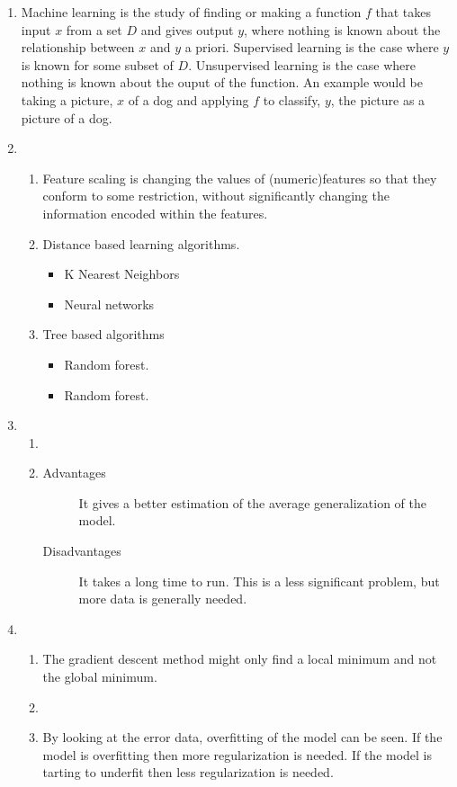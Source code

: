 \begin{enumerate}
  \item Machine learning is the study of finding or making a function $f$ that takes input $x$ from a set $D$ and gives output $y$, where nothing is known about the relationship between $x$ and $y$ a priori.
        Supervised learning is the case where $y$ is known for some subset of $D$.
        Unsupervised learning is the case where nothing is known about the ouput of the function.
        An example would be taking a picture, $x$ of a dog and applying $f$ to classify, $y$, the picture as a picture of a dog.
  \item
      \begin{enumerate}
        \item Feature scaling is changing the values of (numeric)features so that they conform to some restriction, without significantly changing the information encoded within the features.
        \item Distance based learning algorithms.
          \begin{itemize}
            \item K Nearest Neighbors
            \item Neural networks
          \end{itemize}
        \item Tree based algorithms
          \begin{itemize}
            \item Random forest.
            \item Random forest.
          \end{itemize}
      \end{enumerate}
    \item
      \begin{enumerate}
        \item
        \item
          \begin{description}
              \item[Advantages] It gives a better estimation of the average generalization of the model.
              \item[Disadvantages] It takes a long time to run.
                                   This is a less significant problem, but more data is generally needed.
          \end{description}
      \end{enumerate}
    \item
      \begin{enumerate}
          \item
            The gradient descent method might only find a local minimum and not the global minimum.
          \item

          \item
            By looking at the error data, overfitting of the model can be seen.
            If the model is overfitting then more regularization is needed.
            If the model is tarting to underfit then less regularization is needed.
      \end{enumerate}
\end{enumerate}
